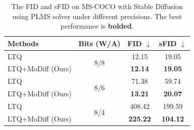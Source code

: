 \begin{table}[h!]
\centering
\caption{The FID and sFID on MS-COCO with Stable Diffusion using PLMS solver under different precisions. The best performance is \textbf{bolded}.}
\begin{tabular}{l|c|c|c}
\toprule
{Methods} & {Bits (W/A)} & FID $\downarrow$ & sFID $\downarrow$ \\
\midrule
LTQ & \multirow{2}{*}{8/8} & 12.15 & 19.05 \\
LTQ+MoDiff (Ours) & & \bf 12.14 & \bf 19.05 \\
\midrule
LTQ & \multirow{2}{*}{8/6} & 71.38 & 59.74 \\
LTQ+MoDiff (Ours) & & \bf 13.21 & \bf 20.07 \\
\midrule
LTQ & \multirow{2}{*}{8/4} & 408.42 & 199.59 \\
LTQ+MoDiff (Ours) & & \bf 225.22 & \bf 104.12 \\
\bottomrule
\end{tabular}
\label{tab:stable}
\end{table}